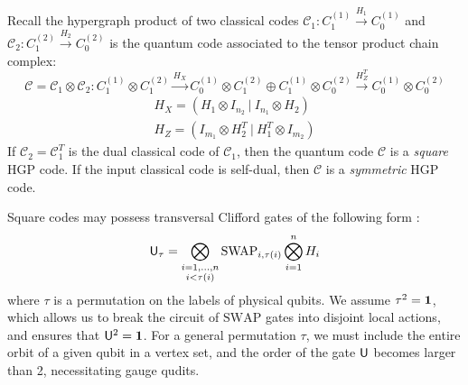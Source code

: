 \documentclass[11pt]{article}
\begin{document}
Recall the hypergraph product of two classical codes $\mathcal{C}_1: C_1^{(1)}\overset{H_1}{\rightarrow} C_0^{(1)}$ and $\mathcal{C}_2:C_1^{(2)}\overset{H_2}{\rightarrow}C_0^{(2)}$ is the quantum code associated to the tensor product chain complex: 
\begin{equation}
    \mathcal{C} = \mathcal{C}_1 \otimes \mathcal{C}_2: C_1^{(1)} \otimes C_1^{(2)} \overset{H_X}{\rightarrow} C_0^{(1)} \otimes C_1^{(2)} \oplus C_1^{(1)} \otimes C_0^{(2)} \overset{H^T_Z}{\rightarrow} C_0^{(1)} \otimes C_0^{(2)}
\end{equation}
\begin{align}
    H_X = (H_1\otimes I_{n_2}\ |\ I_{n_1}\otimes H_2)\\
    H_Z = (I_{m_1}\otimes H^T_2\ |\ H_1^T\otimes I_{m_2})
\end{align}
If $\mathcal{C}_2 = \mathcal{C}_1^T$ is the dual classical code of $\mathcal{C}_1$, then the quantum code $\mathcal{C}$ is a \emph{square} HGP code. If the input classical code is self-dual, then $\mathcal{C}$ is a \emph{symmetric} HGP code.

Square codes may possess transversal Clifford gates of the following form \cite{Breuckmann2024}: 
\begin{equation}
    \mathsf{U}_\tau = \bigotimes_{\substack{i = 1, \dots, n \\ i < \tau(i)}} \text{SWAP}_{i, \tau(i)} \bigotimes_{i = 1}^n H_i
\end{equation}
where $\tau$ is a permutation on the labels of physical qubits. We assume $\tau^2 = \mathbf{1}$, which allows us to break the circuit of $\text{SWAP}$ gates into disjoint local actions, and ensures that $\mathsf{U}^2 = \mathbf{1}$. For a general permutation $\tau$, we must include the entire orbit of a given qubit in a vertex set, and the order of the gate $\mathsf{U}$ becomes larger than 2, necessitating gauge qudits.
\end{document}

